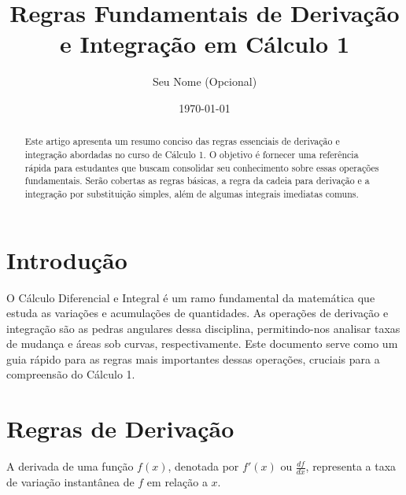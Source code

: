 \documentclass{article}
\title{Regras Fundamentais de Derivação e Integração em Cálculo 1}
\author{Seu Nome (Opcional)}
\date{\today}
\begin{document}
\maketitle

\begin{abstract}
Este artigo apresenta um resumo conciso das regras essenciais de derivação e integração abordadas no curso de Cálculo 1. O objetivo é fornecer uma referência rápida para estudantes que buscam consolidar seu conhecimento sobre essas operações fundamentais. Serão cobertas as regras básicas, a regra da cadeia para derivação e a integração por substituição simples, além de algumas integrais imediatas comuns.
\end{abstract}

\section{Introdução}
O Cálculo Diferencial e Integral é um ramo fundamental da matemática que estuda as variações e acumulações de quantidades. As operações de derivação e integração são as pedras angulares dessa disciplina, permitindo-nos analisar taxas de mudança e áreas sob curvas, respectivamente. Este documento serve como um guia rápido para as regras mais importantes dessas operações, cruciais para a compreensão do Cálculo 1.

\section{Regras de Derivação}
A derivada de uma função $f(x)$, denotada por $f'(x)$ ou $\frac{df}{dx}$, representa a taxa de variação instantânea de $f$ em relação a $x$.
\end{document}
